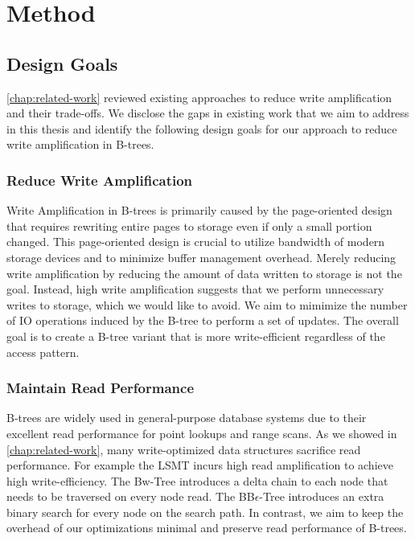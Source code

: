 \chapter{Method}
\label{chap:method}

\section{Design Goals}
\autoref{chap:related-work} reviewed existing approaches to reduce write amplification and their trade-offs.
We disclose the gaps in existing work that we aim to address in this thesis and identify the following design goals for our approach to reduce write amplification in B-trees.

\subsection*{Reduce Write Amplification}
Write Amplification in B-trees is primarily caused by the page-oriented design that requires rewriting entire pages to storage even if only a small portion changed.
This page-oriented design is crucial to utilize bandwidth of modern storage devices and to minimize buffer management overhead.
Merely reducing write amplification by reducing the amount of data written to storage is not the goal.
Instead, high write amplification suggests that we perform unnecessary writes to storage, which we would like to avoid.
We aim to mimimize the number of \ac{IO} operations induced by the B-tree to perform a set of updates.
The overall goal is to create a B-tree variant that is more write-efficient regardless of the access pattern.

\subsection*{Maintain Read Performance}
B-trees are widely used in general-purpose database systems due to their excellent read performance for point lookups and range scans.
As we showed in \autoref{chap:related-work}, many write-optimized data structures sacrifice read performance.
For example the \ac{LSMT} incurs high read amplification to achieve high write-efficiency. 
The Bw-Tree introduces a delta chain to each node that needs to be traversed on every node read.
The BB$\epsilon$-Tree introduces an extra binary search for every node on the search path.
In contrast, we aim to keep the overhead of our optimizations minimal and preserve read performance of B-trees.


